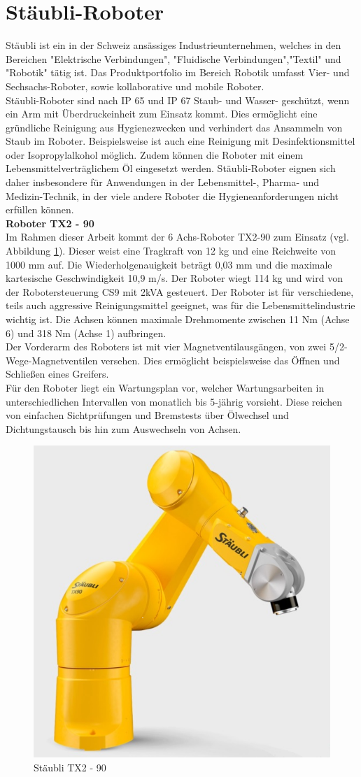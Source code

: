 \documentclass[ a4paper,
                oneside,
                toc=bibliography,
                toc=listof
                ]{scrbook}
\begin{document}
   	
   	\section{Stäubli-Roboter}
   	Stäubli ist ein in der Schweiz ansässiges Industrieunternehmen, welches in den Bereichen "Elektrische Verbindungen", "Fluidische Verbindungen","Textil" und "Robotik" tätig ist. Das Produktportfolio im Bereich Robotik umfasst Vier- und Sechsachs-Roboter, sowie kollaborative und mobile Roboter. \cite{StaubliUberUns}\\ Stäubli-Roboter sind nach IP 65 und IP 67 Staub- und Wasser- geschützt, wenn ein Arm mit Überdruckeinheit zum Einsatz kommt. Dies ermöglicht eine gründliche Reinigung aus Hygienezwecken und verhindert das Ansammeln von Staub im Roboter. Beispielsweise ist auch eine Reinigung mit Desinfektionsmittel oder Isopropylalkohol möglich. Zudem können die Roboter mit einem Lebensmittelverträglichem Öl eingesetzt werden. Stäubli-Roboter eignen sich daher insbesondere für Anwendungen in der Lebensmittel-, Pharma- und Medizin-Technik, in der viele andere Roboter die Hygieneanforderungen nicht erfüllen können. \cite{StaubliProduktubersicht}\\
   	\textbf{Roboter TX2 - 90}\\
   	Im Rahmen dieser Arbeit kommt der 6 Achs-Roboter TX2-90 zum Einsatz (vgl. Abbildung \ref{fig:TX90}). Dieser weist eine Tragkraft von 12 kg und eine Reichweite von 1000 mm auf. Die Wiederholgenauigkeit beträgt 0,03 mm und die maximale kartesische Geschwindigkeit 10,9 m/s. Der Roboter wiegt 114 kg und wird von der Robotersteuerung CS9 mit 2kVA gesteuert. Der Roboter ist für verschiedene, teils auch aggressive Reinigungsmittel geeignet, was für die Lebensmittelindustrie wichtig ist. Die Achsen können maximale Drehmomente zwischen 11 Nm (Achse 6) und 318 Nm (Achse 1) aufbringen.\\
   	Der Vorderarm des Roboters ist mit vier Magnetventilausgängen, von zwei 5/2-Wege-Magnetventilen versehen. Dies ermöglicht beispielsweise das Öffnen und Schließen eines Greifers.\\
   	Für den Roboter liegt ein Wartungsplan vor, welcher Wartungsarbeiten in unterschiedlichen Intervallen von monatlich bis 5-jährig vorsieht. Diese reichen von einfachen Sichtprüfungen und Bremstests über Ölwechsel und Dichtungstausch bis hin zum Auswechseln von Achsen. \cite{X90}
   	\begin{figure}[!ht]
   		\centering
   		\includegraphics[width=0.50\linewidth]{./images/X90.png}
   		\caption{Stäubli TX2 - 90 \cite{X90}} 
   		\label{fig:TX90}
   	\end{figure}
\end{document}
